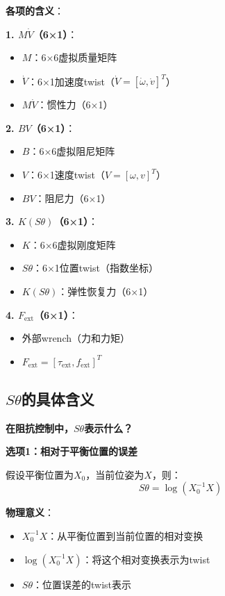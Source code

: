 \documentclass[12pt,a4paper]{article}
\begin{document}
\textbf{各项的含义}：

\textbf{1. $M\dot{V}$（6×1）}：
\begin{itemize}
\item $M$：6×6虚拟质量矩阵
\item $\dot{V}$：6×1加速度twist（$\dot{V} = [\dot{\omega}, \dot{v}]^T$）
\item $M\dot{V}$：惯性力（6×1）
\end{itemize}

\textbf{2. $BV$（6×1）}：
\begin{itemize}
\item $B$：6×6虚拟阻尼矩阵
\item $V$：6×1速度twist（$V = [\omega, v]^T$）
\item $BV$：阻尼力（6×1）
\end{itemize}

\textbf{3. $K(S\theta)$（6×1）}：
\begin{itemize}
\item $K$：6×6虚拟刚度矩阵
\item $S\theta$：6×1位置twist（指数坐标）
\item $K(S\theta)$：弹性恢复力（6×1）
\end{itemize}

\textbf{4. $F_{\text{ext}}$（6×1）}：
\begin{itemize}
\item 外部wrench（力和力矩）
\item $F_{\text{ext}} = [\tau_{\text{ext}}, f_{\text{ext}}]^T$
\end{itemize}

\subsection{$S\theta$的具体含义}

\textbf{在阻抗控制中，$S\theta$表示什么？}

\textbf{选项1：相对于平衡位置的误差}

假设平衡位置为$X_0$，当前位姿为$X$，则：
\begin{equation}
S\theta = \log(X_0^{-1} X)
\end{equation}

\textbf{物理意义}：
\begin{itemize}
\item $X_0^{-1} X$：从平衡位置到当前位置的相对变换
\item $\log(X_0^{-1} X)$：将这个相对变换表示为twist
\item $S\theta$：位置误差的twist表示
\end{itemize}
\end{document}
